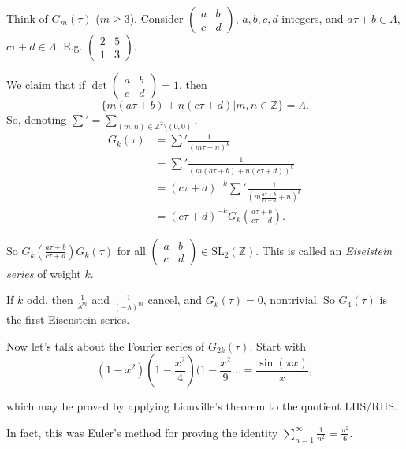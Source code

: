 Think of $G_m(\tau)$ ($m\geq 3$).
Consider
$\begin{pmatrix}
a&b\\
c&d
\end{pmatrix}$,
$a,b,c,d$ integers,
and  $a\tau+b \in \Lambda$, $c\tau+d \in
\Lambda$.
E.g. $\begin{pmatrix}
2&5\\
1&3
\end{pmatrix}$.

We claim that if $\det \begin{pmatrix}
a&b\\
c&d
\end{pmatrix}=1$,
then
$$
\{m(a\tau+b)+n(c\tau+d)|m,n\in
\mathbb{Z}\}=\Lambda.
$$
So, denoting $\sum'=\sum_{(m,n) \in
\mathbb{Z}^2\setminus(0,0)}$,
$$
\begin{aligned}
G_k(\tau)&=\sum'\frac{1}{(m\tau+n)^k}\\
&=\sum'\frac{1}{(m(a\tau+b)+n(c\tau+d))^k}\\
&=(c\tau+d)^{-k}\sum'\frac{1}{\left(
m\frac{a\tau+b}{c\tau+d}+n\right)^k}\\
&=(c\tau+d)^{-k}G_k\left(\frac{a\tau+b}
{c\tau+d}\right).
\end{aligned}
$$

\noindent
So
$G_k\left(\frac{a\tau+b}{c\tau+d}\right)
G_k(\tau)$
for all $\begin{pmatrix}
a&b\\
c&d
\end{pmatrix}\in \text{SL}_2(\mathbb{Z})$.
This is called an {\it Eiseistein series} of
weight $k$.

\begin{remark}
\label{remark-firs-eisestein-series}
If $k$ odd, then $\frac{1}{\lambda^m}$ and
$\frac{1}{(-\lambda)^m}$
cancel, and $G_k(\tau)=0$, nontrivial.
So $G_4(\tau)$ is the first Eisenstein
series.
\end{remark}

\medskip\noindent
Now let's talk about the Fourier series of
$G_{2k}(\tau)$.
Start with
\begin{equation}
\label{equation-euler}
(1-x^2)(1-\frac{x^2}{4})(1-\frac{x^2}{9}
\ldots=\frac{\sin(\pi
x)}{x},
\end{equation}

\noindent
which may be proved by applying Liouville's
theorem
to the quotient LHS/RHS.

In fact, this was Euler's method for proving
the identity
$\sum_{n=1}^\infty
\frac{1}{n^2}=\frac{\pi^2}{6}$.

